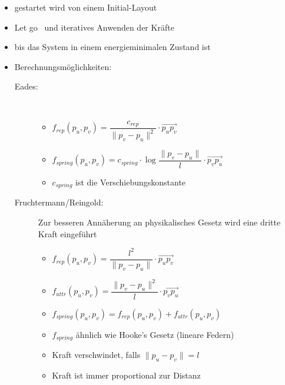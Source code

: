 \begin{itemize}[itemsep=-1pt]
	\item gestartet wird von einem Initial-Layout
	\item \glqq Let go\grqq~ und iteratives Anwenden der Kräfte
	\item bis das System in einem energieminimalen Zustand ist
	\item Berechnungsmöglichkeiten:
		\begin{description}
			\item[Eades:]\ \\ \vspace*{-\baselineskip}
				\begin{itemize}
					\item $f_{rep}(p_u,p_v)=\dfrac{c_{rep}}{\|p_v-p_u\|^2}\cdot \overrightarrow{p_up_v}$
					\item $f_{spring}(p_u,p_v)=c_{spring}\cdot \log \dfrac{\|p_v-p_u\|}{l}\cdot \overrightarrow{p_vp_u}$
					\item $c_{spring}$ ist die \glqq Verschiebungskonstante\grqq
				\end{itemize}
			\item[Fruchtermann/Reingold:] Zur besseren Annäherung an physikalisches Gesetz wird eine dritte Kraft eingeführt \\ \vspace*{-\baselineskip}
				\begin{itemize}
					\item $f_{rep}(p_u,p_v)=\dfrac{l^2}{\|p_v-p_u\|}\cdot \overrightarrow{p_up_v}$
					\item $f_{attr}(p_u,p_v)=\dfrac{\|p_v-p_u\|^2}{l}\cdot \overrightarrow{p_vp_u}$
					\item $f_{spring}(p_u,p_v)=f_{rep}(p_u,p_v)+f_{attr}(p_u,p_v)$
					\item $f_{spring}$ ähnlich wie Hooke's Gesetz (lineare Federn)
					\item Kraft verschwindet, falls $\|p_u-p_v\|=l$
					\item Kraft ist immer proportional zur Distanz
				\end{itemize}
		\end{description}
\end{itemize}
